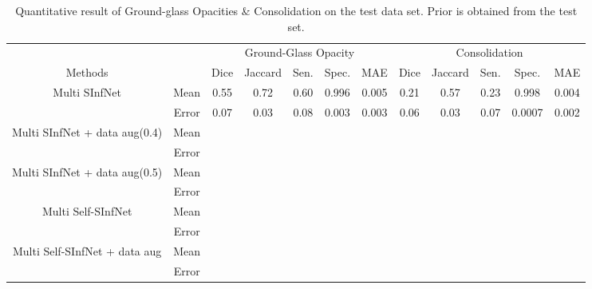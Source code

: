 \begin{table}
	\centering
	\begin{tabular}{| c | c || c c c c c || c c c c c |}
		\hline
		& &\multicolumn{5}{c||}{Ground-Glass Opacity} & \multicolumn{5}{c|}{Consolidation}\\ \cline{3-12}
		Methods & & Dice & Jaccard & Sen. & Spec. & MAE & Dice & Jaccard & Sen. & Spec. & MAE \\\hline
		Multi SInfNet & Mean & 0.55 & 0.72 & 0.60 & 0.996 & 0.005 & 0.21 & 0.57  &0.23  &0.998  &0.004   \\ \cline{2-12}
		& Error & 0.07 & 0.03 & 0.08 & 0.003 & 0.003 & 0.06 & 0.03 & 0.07 & 0.0007 & 0.002 \\ \hline \hline
		
		Multi SInfNet + data aug(0.4) & Mean &  &  &  &  &  &  &  &  &  &   \\ \cline{2-12}
		& Error &  &  &  &  &  &  &  &  &  &   \\ \hline \hline
		
		Multi SInfNet + data aug(0.5) & Mean &  &  &  &  &  &  &  &  &  &   \\ \cline{2-12}
		& Error &  &  &  &  &  &  &  &  &  &   \\ \hline \hline
		
		Multi Self-SInfNet & Mean & & & & & & & & & &  \\ \cline{2-12}
		& Error & & & & & & & & & &  \\ \hline \hline
		
		Multi Self-SInfNet + data aug & Mean & & & & & & & & & &  \\ \cline{2-12}
		& Error & & & & & & & & & &  \\ \hline \hline
	\end{tabular}
	\caption{Quantitative result of Ground-glass Opacities \& Consolidation on the test data set. Prior is obtained from the test set.}
\end{table}

